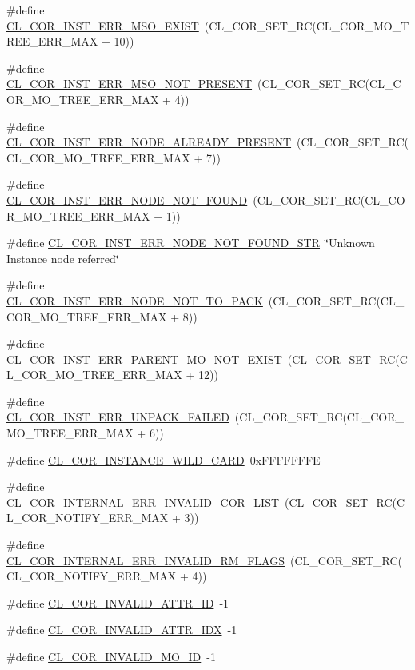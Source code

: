\begin{CompactItemize}
\item 
\#define \hyperlink{group__group13_ga210}{CL\_\-COR\_\-INST\_\-ERR\_\-MSO\_\-EXIST}~(CL\_\-COR\_\-SET\_\-RC(CL\_\-COR\_\-MO\_\-TREE\_\-ERR\_\-MAX + 10))
\item 
\#define \hyperlink{group__group13_ga204}{CL\_\-COR\_\-INST\_\-ERR\_\-MSO\_\-NOT\_\-PRESENT}~(CL\_\-COR\_\-SET\_\-RC(CL\_\-COR\_\-MO\_\-TREE\_\-ERR\_\-MAX + 4))
\item 
\#define \hyperlink{group__group13_ga207}{CL\_\-COR\_\-INST\_\-ERR\_\-NODE\_\-ALREADY\_\-PRESENT}~(CL\_\-COR\_\-SET\_\-RC(CL\_\-COR\_\-MO\_\-TREE\_\-ERR\_\-MAX + 7))
\item 
\#define \hyperlink{group__group13_ga201}{CL\_\-COR\_\-INST\_\-ERR\_\-NODE\_\-NOT\_\-FOUND}~(CL\_\-COR\_\-SET\_\-RC(CL\_\-COR\_\-MO\_\-TREE\_\-ERR\_\-MAX + 1))
\item 
\#define \hyperlink{group__group13_ga271}{CL\_\-COR\_\-INST\_\-ERR\_\-NODE\_\-NOT\_\-FOUND\_\-STR}~\char`\"{}Unknown Instance node referred\char`\"{}
\item 
\#define \hyperlink{group__group13_ga208}{CL\_\-COR\_\-INST\_\-ERR\_\-NODE\_\-NOT\_\-TO\_\-PACK}~(CL\_\-COR\_\-SET\_\-RC(CL\_\-COR\_\-MO\_\-TREE\_\-ERR\_\-MAX + 8))
\item 
\#define \hyperlink{group__group13_ga212}{CL\_\-COR\_\-INST\_\-ERR\_\-PARENT\_\-MO\_\-NOT\_\-EXIST}~(CL\_\-COR\_\-SET\_\-RC(CL\_\-COR\_\-MO\_\-TREE\_\-ERR\_\-MAX + 12))
\item 
\#define \hyperlink{group__group13_ga206}{CL\_\-COR\_\-INST\_\-ERR\_\-UNPACK\_\-FAILED}~(CL\_\-COR\_\-SET\_\-RC(CL\_\-COR\_\-MO\_\-TREE\_\-ERR\_\-MAX + 6))
\item 
\#define \hyperlink{group__group13_ga292}{CL\_\-COR\_\-INSTANCE\_\-WILD\_\-CARD}~0x\-FFFFFFFE
\item 
\#define \hyperlink{group__group13_ga231}{CL\_\-COR\_\-INTERNAL\_\-ERR\_\-INVALID\_\-COR\_\-LIST}~(CL\_\-COR\_\-SET\_\-RC(CL\_\-COR\_\-NOTIFY\_\-ERR\_\-MAX + 3))
\item 
\#define \hyperlink{group__group13_ga232}{CL\_\-COR\_\-INTERNAL\_\-ERR\_\-INVALID\_\-RM\_\-FLAGS}~(CL\_\-COR\_\-SET\_\-RC(CL\_\-COR\_\-NOTIFY\_\-ERR\_\-MAX + 4))
\item 
\#define \hyperlink{group__group13_ga295}{CL\_\-COR\_\-INVALID\_\-ATTR\_\-ID}~-1
\item 
\#define \hyperlink{group__group13_ga296}{CL\_\-COR\_\-INVALID\_\-ATTR\_\-IDX}~-1
\item 
\#define \hyperlink{group__group13_ga288}{CL\_\-COR\_\-INVALID\_\-MO\_\-ID}~-1
\item 

\end{CompactItemize}
